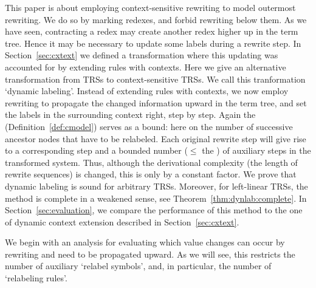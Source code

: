 
This paper is about employing context-sensitive rewriting to model outermost rewriting.
We do so by marking redexes, and forbid rewriting below them.
As we have seen, contracting a redex may create another redex higher up in the term tree.
Hence it may be necessary to update some labels during a rewrite step.
In Section~\ref{sec:cxtext} we defined a transformation where this updating 
was accounted for by extending rules with contexts.
Here we give an alternative transformation from TRSs to context-sensitive TRS{s}.
We call this tranformation `dynamic labeling'.
Instead of extending rules with contexts, 
we now employ rewriting to propagate the changed information upward in the term tree,
and set the labels in the surrounding context right, step by step.
Again the \cdepth{} (Definition~\ref{def:cmodel}) serves as a bound:
here on the number of successive ancestor nodes that have to be relabeled.
Each original rewrite step will give rise to a corresponding step and a bounded number ($\leq$ the \cdepth{}) 
of auxiliary steps in the transformed system. 
Thus, although the derivational complexity (the length of rewrite sequences) 
is changed, this is only by a constant factor.
We prove that dynamic labeling is sound for arbitrary TRSs.
Moreover, for left-linear TRSs, the method is complete in a weakened sense, 
see Theorem~\ref{thm:dynlab:complete}.
In Section~\ref{sec:evaluation}, we compare the performance of this method 
to the one of dynamic context extension described in Section~\ref{sec:cxtext}.

We begin with an analysis for evaluating which value changes can occur by rewriting and need to be propagated upward.
As we will see, this restricts the number of auxiliary `relabel symbols', and, in particular,
the number of `relabeling rules'.

